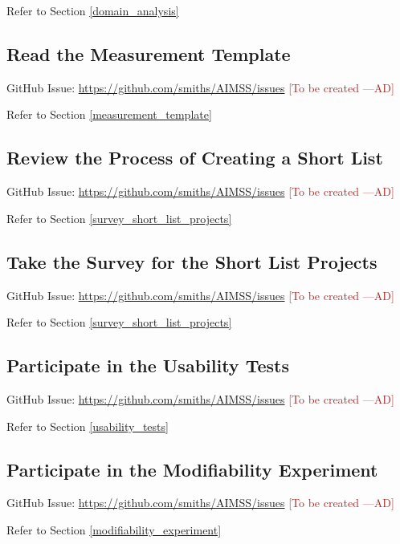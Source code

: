 \documentclass[12pt]{article}
\newcommand{\authornote}[3]{\textcolor{#1}{[#3 ---#2]}}
\newcommand{\authornote}[3]{}
\newcommand{\ad}[1]{\authornote{brown}{AD}{#1}} %
\begin{document}
\noindent Refer to Section \ref{domain_analysis}

\subsection{Read the Measurement Template}
\label{task_measurement_template}
GitHub Issue:
\href{https://github.com/smiths/AIMSS/issues}{https://github.com/smiths/AIMSS/issues}
\ad{To be created}

\noindent Refer to Section \ref{measurement_template}

\subsection{Review the Process of Creating a Short List}
\label{task_review_short_list}
GitHub Issue:
\href{https://github.com/smiths/AIMSS/issues}{https://github.com/smiths/AIMSS/issues}
\ad{To be created}

\noindent Refer to Section \ref{survey_short_list_projects}

\subsection{Take the Survey for the Short List Projects}
\label{task_short_list_survey}
GitHub Issue:
\href{https://github.com/smiths/AIMSS/issues}{https://github.com/smiths/AIMSS/issues}
\ad{To be created}

\noindent Refer to Section \ref{survey_short_list_projects}

\subsection{Participate in the Usability Tests}
\label{task_usability_tests}
GitHub Issue:
\href{https://github.com/smiths/AIMSS/issues}{https://github.com/smiths/AIMSS/issues}
\ad{To be created}

\noindent Refer to Section \ref{usability_tests}

\subsection{Participate in the Modifiability Experiment}
\label{task_modifiability_experiment}
GitHub Issue:
\href{https://github.com/smiths/AIMSS/issues}{https://github.com/smiths/AIMSS/issues}
\ad{To be created}

\noindent Refer to Section \ref{modifiability_experiment}
\end{document}
